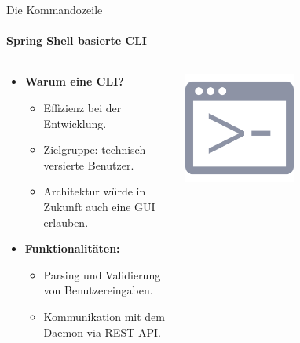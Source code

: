 \documentclass[
    ngerman,%
    authorontitle=true,
]{bfhbeamer}
\begin{document}
    \begin{frame}{Die Kommandozeile}
        \framesubtitle{Spring Shell basierte CLI}
        \begin{columns}
            \begin{column}{0.7\textwidth}
                \begin{itemize}
                    \item \textbf{Warum eine CLI?}
                    \begin{itemize}
                        \item Effizienz bei der Entwicklung.
                        \item Zielgruppe: technisch versierte Benutzer.
                        \item Architektur würde in Zukunft auch eine GUI erlauben.
                    \end{itemize}
                    \item \textbf{Funktionalitäten:}
                    \begin{itemize}
                        \item Parsing und Validierung von Benutzereingaben.
                        \item Kommunikation mit dem Daemon via REST-API\@.
                    \end{itemize}
                \end{itemize}
            \end{column}
            \begin{column}{0.3\textwidth}
                \begin{center}
                    \includegraphics[width=0.5\textwidth]{assets/presentation/prompt}
                \end{center}
            \end{column}
        \end{columns}
    \end{frame}
\end{document}
